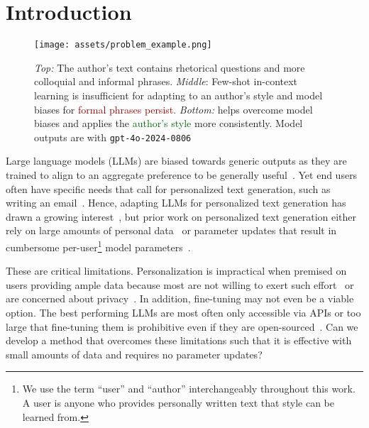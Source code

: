 \section{Introduction}


\begin{figure}[ht]
    \centering
    \texttt{[image: assets/problem\_example.png]}
    \caption{\textit{Top:} The author's text contains rhetorical questions and more colloquial and informal phrases.
    \textit{Middle}: Few-shot in-context learning is insufficient for adapting to an author's style and model biases for \textcolor{darkred}{formal phrases persist.}
    \textit{Bottom:} \ours helps overcome model biases and applies the \textcolor{darkgreen}{author's style} more consistently. 
    Model outputs are with \texttt{gpt-4o-2024-0806}
    }
    \label{fig:motivating_example} 
\end{figure}


Large language models (LLMs) are biased towards generic outputs as they are trained to align to an aggregate preference to be generally useful~\cite{padmakumar2024does,rafailov2024direct, lee2023rlaif, wang-etal-2023-self-instruct}. 
Yet end users often have specific needs that call for personalized text generation, such as writing an email~\cite{kumar2024longlampbenchmarkpersonalizedlongform, salemi2023lamp}. 
Hence, adapting LLMs for personalized text generation has drawn a growing interest~\cite{ jang2023personalized, shaikh2024show, mysore2023pearl, li2024learning}, but prior work on personalized text generation either rely on large amounts of personal data~\cite{li2024learning, li2023teach, mysore2023pearl} or parameter updates that result in cumbersome per-user\footnote{We use the term ``user'' and ``author'' interchangeably throughout this work. A user is anyone who provides personally written text that style can be learned from.} model parameters~\cite{shaikh2024show, liu-etal-2023-recap}.

These are critical limitations. 
Personalization is impractical when premised on users providing ample data because most are not willing to exert such effort~\cite{ tetard2009lazy} or are concerned about privacy~\cite{plant2022you}.
In addition, fine-tuning may not even be a viable option. The best performing LLMs are most often only accessible via APIs or too large that fine-tuning them is prohibitive even if they are open-sourced~\cite{touvron2023llama, firsich-rios-2024-gpt4, TheC3}.
Can we develop a method that overcomes these limitations such that it is effective with small amounts of data and requires no parameter updates? 

